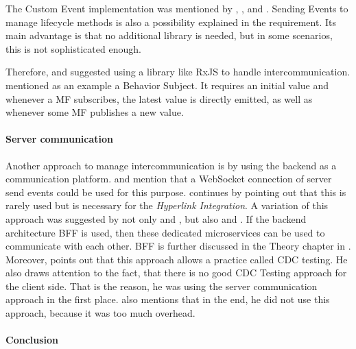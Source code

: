 The Custom Event implementation was mentioned by \textciteSteyer{}, \textcite{Jackson.2019}, \textcite{Grijzen.2019} and \textcite{Dornenburg.2019}.
Sending Events to manage lifecycle methods is also a possibility explained in the \textit{} requirement.
Its main advantage is that no additional library is needed, but in some scenarios, this is not sophisticated enough.

Therefore, \citeauthorSteyer{} and \textcite{Leitner.2020} suggested using a library like RxJS to handle intercommunication.
\citeauthorSteyer{} mentioned as an example a Behavior Subject.
It requires an initial value and whenever a \ac{MF} subscribes, the latest value is directly emitted, as well as whenever some \ac{MF} publishes a new value\footnotemark{}.



\paragraph{Server communication}

Another approach to manage intercommunication is by using the backend as a communication platform.
\citeauthorSteyer{} and \citeauthor{Dornenburg.2019} mention that a WebSocket connection of server send events could be used for this purpose.
\citeauthorSteyer{} continues by pointing out that this is rarely used but is necessary for the \textit{Hyperlink Integration}.
A variation of this approach was suggested by not only \citeauthorSteyer{} and \citeauthor{Dornenburg.2019}, but also \textciteJovanovic{} and \textcite{Laug.2018}.
If the backend architecture \ac{BFF} is used, then these dedicated microservices can be used to communicate with each other.
\ac{BFF} is further discussed in the Theory chapter in \textit{}.
Moreover, \citeauthor{Laug.2018} points out that this approach allows a practice called \ac{CDC} testing.
He also draws attention to the fact, that there is no good \ac{CDC} Testing approach for the client side.
That is the reason, he was using the server communication approach in the first place.
\citeauthorJovanovic{} also mentions that in the end, he did not use this approach, because it was too much overhead.



\paragraph{Conclusion}

